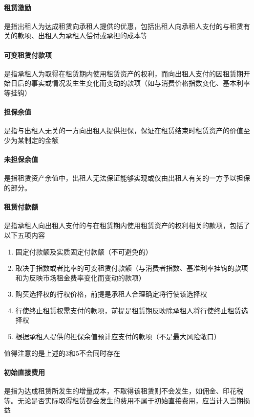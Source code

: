 \documentclass[UTF8,12pt]{ctexart}
\numberwithin{equation}{section} %
\numberwithin{figure}{section}
\numberwithin{table}{section}
\begin{document}
	\paragraph{租赁激励}是指出租人为达成租赁向承租人提供的优惠，包括出租人向承租人支付的与租赁有关的款项、出租人为承租人偿付或承担的成本等
	
	\paragraph{可变租赁付款项}是指承租人为取得在租赁期内使用租赁资产的权利，而向出租人支付的因租赁期开始日后的事实或情况发生生变化而变动的款项（如与消费价格指数变化、基本利率等挂钩）
	
	\paragraph{担保余值}是指与出租人无关的一方向出租人提供担保，保证在租赁结束时租赁资产的价值至少为某制定的金额
	
	\paragraph{未担保余值}是指租赁资产余值中，出租人无法保证能够实现或仅由出租人有关的一方予以担保的部分。
	
	\paragraph{租赁付款额}是指承租人向出租人支付的与在租赁期内使用租赁资产的权利相关的款项，包括了以下五项内容
	\begin{enumerate}
		\item 固定付款额及实质固定付款额（不可避免的）
		
		\item 取决于指数或者比率的可变租赁付款额（与消费者指数、基准利率挂钩的款项和为反映市场租金费率变化而变动的款项）
		
		\item 购买选择权的行权价格，前提是承租人合理确定将行使该选择权
		
		\item 行使终止租赁权需支付的款项，前提是租赁期反映除承租人将行使终止租赁选择权
		
		\item 根据承租人提供的担保余值预计应支付的款项（不是最大风险敞口）
	\end{enumerate}
	值得注意的是上述的3和5不会同时存在
	
	\paragraph{初始直接费用}是指为达成租赁所发生的增量成本，不取得该租赁则不会发生，如佣金、印花税等。无论是否实际取得租赁都会发生的费用不属于初始直接费用，应当计入当期损益
	
\end{document}
